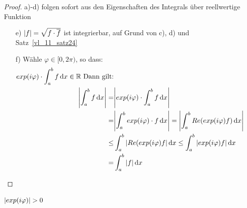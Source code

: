 \begin{proof}
	a)-d) folgen sofort aus den Eigenschaften des Integrals über reellwertige 
	Funktion
	\begin{itemize}
		\item[e)] $\abs{f} = \sqrt{f \cdot \overline{f}}$ ist integrierbar, 
		auf Grund von c), d) und Satz~\ref{vl_11_satz24} 
		\item[f)] Wähle $\varphi \in [0, 2\pi)$, so dass:
		\begin{align*}
			exp(i \varphi) \cdot \int_a^b f \dd{x} \in \mathbb{R} \text{ Dann gilt:} \\
			\abs{\int_a^b f\dd{x} } = & \abs{exp(i \varphi) \cdot \int_a^b f \dd{x}} \\
			 = & \abs{ \int_a^b exp(i \varphi) \cdot f \dd{x}} = \abs{ \int_a^b   
			Re(exp(i \varphi) f) \dd{x}} \\
			 \leq & \int_a^b \abs{Re(exp(i \varphi) f} \dd{x}
			\leq \int_a^b \abs{ exp(i \varphi) f } \dd{x} \\
			= & \int_a^b \abs{f} \dd{x}
		\end{align*}
	\end{itemize}
\end{proof}

\begin{Bemerkung}{
	$\abs{exp(i \varphi)} > 0$
}\end{Bemerkung}